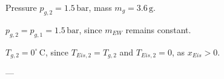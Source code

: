 Pressure \( p_{g,2} = 1.5 \, \text{bar} \), mass \( m_g = 3.6 \, \text{g} \).  

\( p_{g,2} = p_{g,1} = 1.5 \, \text{bar} \), since \( m_{EW} \) remains constant.  

\( T_{g,2} = 0^\circ \, \text{C} \), since \( T_{Eis,2} = T_{g,2} \) and \( T_{Eis,2} = 0 \), as \( x_{Eis} > 0 \).  

---